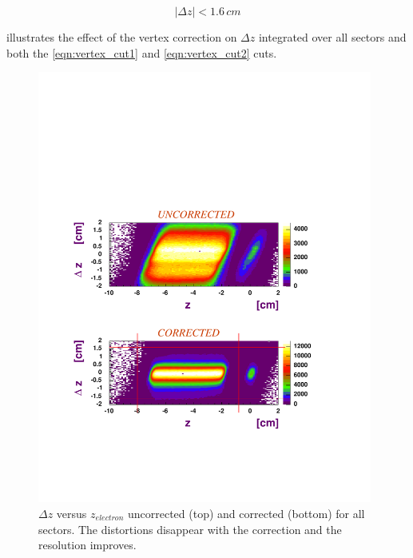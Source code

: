 \begin{equation}
 \left| \Delta z \right| < 1.6 \,cm
 \label{eqn:vertex_cut2} 
\end{equation}

 illustrates the effect of the vertex correction on $\Delta z$ 
integrated over all sectors and
both the \ref{eqn:vertex_cut1} and \ref{eqn:vertex_cut2} cuts.

\begin{figure}[h]
 \begin{center}
  \includegraphics[width=11cm, bb=50 120 520 580]{data_reduction/img/vertex_cut}
  \caption[$\Delta z$ versus $z_{electron}$ uncorrected (top) and corrected (bottom) for all sectors]
          { $\Delta z$ versus $z_{electron}$ uncorrected (top) and corrected (bottom)
                     for all sectors.            
                     The distortions disappear with the correction and the resolution improves. }
 \label{fig:vertex_cut}
  \end{center} 
\end{figure}



























